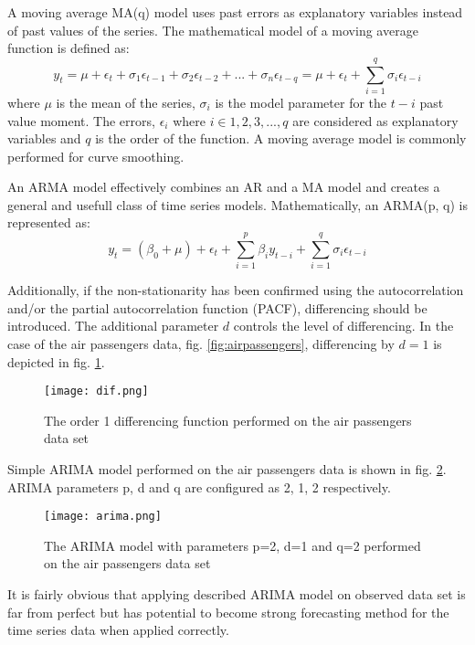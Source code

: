 A moving average MA(q) model uses past errors as explanatory variables instead of past values of the series. The mathematical model of a moving average function is defined as:
\begin{equation}
    y_{t} = \mu + \epsilon_{t} + \sigma_{1}\epsilon_{t-1} + \sigma_{2}\epsilon_{t-2} + ... + \sigma_{n}\epsilon_{t-q} = \mu + \epsilon_{t} + \sum_{i=1}^{q}{\sigma_{i} \epsilon_{t-i}}
\end{equation}
where $\mu$ is the mean of the series, $\sigma_{i}$ is the model parameter for the $t-i$ past value moment.
The errors, $\epsilon_{i}$ where $i \in {1, 2, 3, ..., q}$ are considered as explanatory variables and $q$ is the order of the function.
A moving average model is commonly performed for curve smoothing. 

An ARMA model effectively combines an AR and a MA model and creates a general and usefull class of time series models.
Mathematically, an ARMA(p, q) is represented as:
\begin{equation}
    y_{t} = (\beta_{0} + \mu) + \epsilon_{t} + \sum_{i=1}^{p}\beta_{i} y_{t-i} +  \sum_{i=1}^{q}{\sigma_{i} \epsilon_{t-i}}
\end{equation}

Additionally, if the non-stationarity has been confirmed using the autocorrelation and/or the partial autocorrelation function (PACF), differencing should be introduced. 
The additional parameter $d$ controls the level of differencing.
In the case of the air passengers data, fig. \ref{fig:airpassengers}, differencing by $d = 1$ is depicted in fig. \ref{fig:dif}.
\begin{figure}[h]
    \centering
    \texttt{[image: dif.png]}
    \caption{The order 1 differencing function performed on the air passengers data set}
    \label{fig:dif}
\end{figure}
Simple ARIMA model performed on the air passengers data is shown in fig. \ref{fig:arima}. ARIMA parameters p, d and q are configured as 2, 1, 2 respectively. 
\begin{figure}[h]
    \centering
    \texttt{[image: arima.png]}
    \caption{The ARIMA model with parameters p=2, d=1 and q=2 performed on the air passengers data set}
    \label{fig:arima}
\end{figure}

It is fairly obvious that applying described ARIMA model on observed data set is far from perfect but has potential to become strong forecasting method for the time series data when applied correctly.


